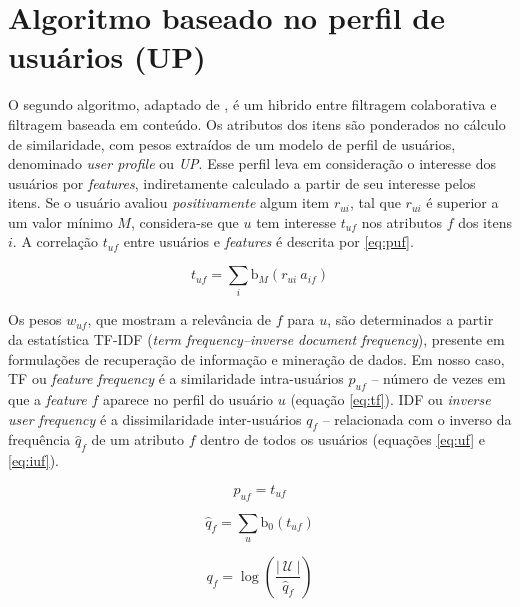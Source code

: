 \section{Algoritmo baseado no perfil de usuários (UP)} %
\label{sec:algoritmo_baseado_no_perfil_de_usu_rios_}


O segundo algoritmo, adaptado de \cite{debnath2008feature}, é um hibrido entre filtragem colaborativa e filtragem baseada em conteúdo. Os atributos dos itens são ponderados no cálculo de similaridade, com pesos extraídos de um modelo de perfil de usuários, denominado \textit{user profile} ou \textit{UP}. Esse perfil leva em consideração o interesse dos usuários por \textit{features}, indiretamente calculado a partir de seu interesse pelos itens. Se o usuário avaliou \textit{positivamente} algum item $r_{ui}$, tal que $r_{ui}$ é superior a um valor mínimo $M$, considera-se que $u$ tem interesse $t_{uf}$ nos atributos $f$ dos itens $i$. A correlação $t_{uf}$ entre usuários e \textit{features} é descrita por \ref{eq:puf}.

\begin{equation}
\label{eq:puf} 
    t_{uf} = \sum_{i}{\mathrm{b}_M\left(r_{ui}~a_{if}\right)} 
\end{equation} 

Os pesos $w_{uf}$, que mostram a relevância de $f$ para $u$, são determinados a partir da estatística TF-IDF (\textit{term frequency--inverse document frequency}), presente em formulações de recuperação de informação e mineração de dados. Em nosso caso, TF ou \textit{feature frequency} é a similaridade intra-usuários $p_{uf}$ -- número de vezes em que a \textit{feature} $f$ aparece no perfil do usuário $u$ (equação \ref{eq:tf}). IDF ou \textit{inverse user frequency} é a dissimilaridade inter-usuários $q_{f}$ -- relacionada com o inverso da frequência $\hat{q}_{f}$ de um atributo $f$ dentro de todos os usuários (equações \ref{eq:uf} e \ref{eq:iuf}).

\begin{equation}
\label{eq:tf} 
    p_{uf} = t_{uf}
\end{equation} 


\begin{equation}
\label{eq:uf} 
    \hat{q}_{f} = \sum_{u}{\mathrm{b}_0\left(t_{uf}\right)}
\end{equation} 

\begin{equation}
\label{eq:iuf} 
    q_{f} = \log \left( \frac{\left|~\mathcal{U}~\right|}{\hat{q}_{f}} \right)
\end{equation} 


